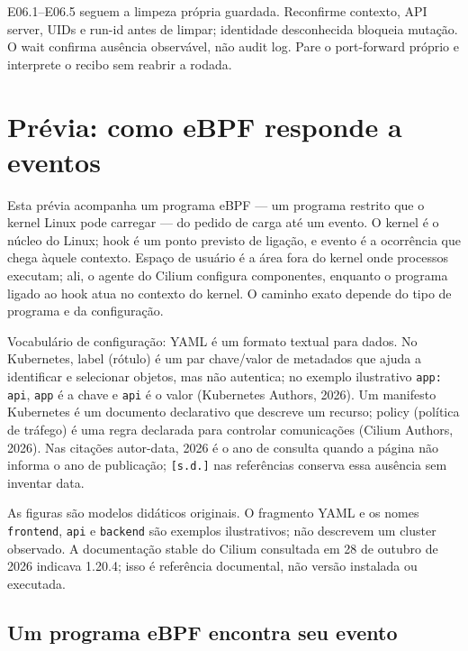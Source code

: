 \documentclass[12pt,openany,oneside,a4paper,chapter=TITLE,english,brazil]{abntex2}
\begin{document}
E06.1--E06.5 seguem a limpeza própria guardada. Reconfirme contexto, API server, UIDs e run-id antes de limpar; identidade desconhecida bloqueia mutação. O wait confirma ausência observável, não audit log. Pare o port-forward próprio e interprete o recibo sem reabrir a rodada.

\clearpage

\chapter*{Prévia: como eBPF responde a eventos}

Esta prévia acompanha um programa eBPF --- um programa restrito que o kernel Linux pode carregar --- do pedido de carga até um evento. O kernel é o núcleo do Linux; hook é um ponto previsto de ligação, e evento é a ocorrência que chega àquele contexto. Espaço de usuário é a área fora do kernel onde processos executam; ali, o agente do Cilium configura componentes, enquanto o programa ligado ao hook atua no contexto do kernel. O caminho exato depende do tipo de programa e da configuração.

Vocabulário de configuração: YAML é um formato textual para dados. No Kubernetes, label (rótulo) é um par chave/valor de metadados que ajuda a identificar e selecionar objetos, mas não autentica; no exemplo ilustrativo \texttt{app:\allowbreak{} api}, \texttt{app} é a chave e \texttt{api} é o valor (Kubernetes Authors, 2026). Um manifesto Kubernetes é um documento declarativo que descreve um recurso; policy (política de tráfego) é uma regra declarada para controlar comunicações (Cilium Authors, 2026). Nas citações autor-data, 2026 é o ano de consulta quando a página não informa o ano de publicação; \texttt{[s.\allowbreak{}d.\allowbreak{}]} nas referências conserva essa ausência sem inventar data.

As figuras são modelos didáticos originais. O fragmento YAML e os nomes \texttt{frontend}, \texttt{api} e \texttt{backend} são exemplos ilustrativos; não descrevem um cluster observado. A documentação stable do Cilium consultada em 28 de outubro de 2026 indicava 1.20.4; isso é referência documental, não versão instalada ou executada.

\section*{Um programa eBPF encontra seu evento}\label{um-programa-ebpf-encontra-seu-evento}
\end{document}
